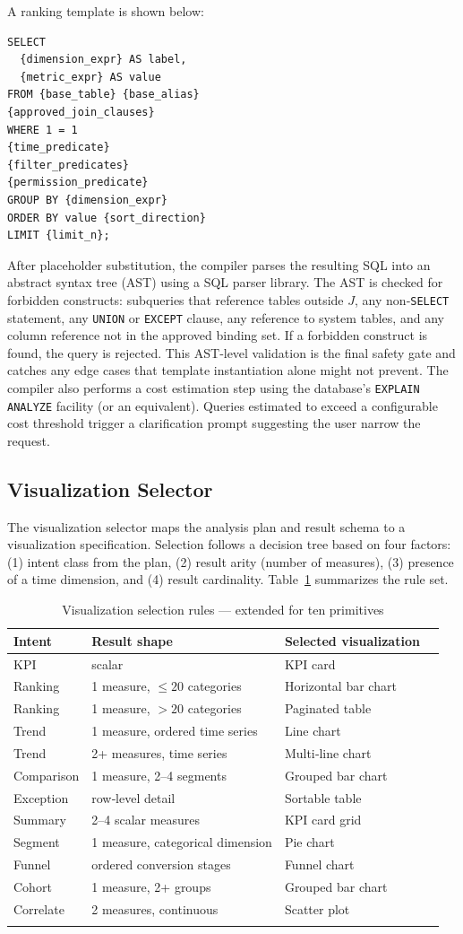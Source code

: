 \documentclass[11pt]{article}
\begin{document}
A ranking template is shown below:
\begin{verbatim}
SELECT
  {dimension_expr} AS label,
  {metric_expr} AS value
FROM {base_table} {base_alias}
{approved_join_clauses}
WHERE 1 = 1
{time_predicate}
{filter_predicates}
{permission_predicate}
GROUP BY {dimension_expr}
ORDER BY value {sort_direction}
LIMIT {limit_n};
\end{verbatim}
After placeholder substitution, the compiler parses the resulting SQL into an abstract syntax tree (AST) using a SQL parser library. The AST is checked for forbidden constructs: subqueries that reference tables outside $J$, any non‑\texttt{SELECT} statement, any \texttt{UNION} or \texttt{EXCEPT} clause, any reference to system tables, and any column reference not in the approved binding set. If a forbidden construct is found, the query is rejected. This AST‑level validation is the final safety gate and catches any edge cases that template instantiation alone might not prevent. The compiler also performs a cost estimation step using the database's \texttt{EXPLAIN ANALYZE} facility (or an equivalent). Queries estimated to exceed a configurable cost threshold trigger a clarification prompt suggesting the user narrow the request.

\subsection{Visualization Selector}
The visualization selector maps the analysis plan and result schema to a visualization specification. Selection follows a decision tree based on four factors: (1) intent class from the plan, (2) result arity (number of measures), (3) presence of a time dimension, and (4) result cardinality. Table~\ref{tab:viz} summarizes the rule set.

\begin{longtable}{llll}
\toprule
\textbf{Intent} & \textbf{Result shape} & \textbf{Selected visualization}\\
\midrule
KPI & scalar & KPI card\\
Ranking & 1 measure, $\leq20$ categories & Horizontal bar chart\\
Ranking & 1 measure, $>20$ categories & Paginated table\\
Trend & 1 measure, ordered time series & Line chart\\
Trend & 2+ measures, time series & Multi‑line chart\\
Comparison & 1 measure, 2–4 segments & Grouped bar chart\\
Exception & row‑level detail & Sortable table\\
Summary & 2–4 scalar measures & KPI card grid\\
Segment & 1 measure, categorical dimension & Pie chart\\
Funnel & ordered conversion stages & Funnel chart\\
Cohort & 1 measure, 2+ groups & Grouped bar chart\\
Correlate & 2 measures, continuous & Scatter plot\\
\bottomrule
\caption{Visualization selection rules --- extended for ten primitives}\label{tab:viz}
\end{longtable}
\end{document}
